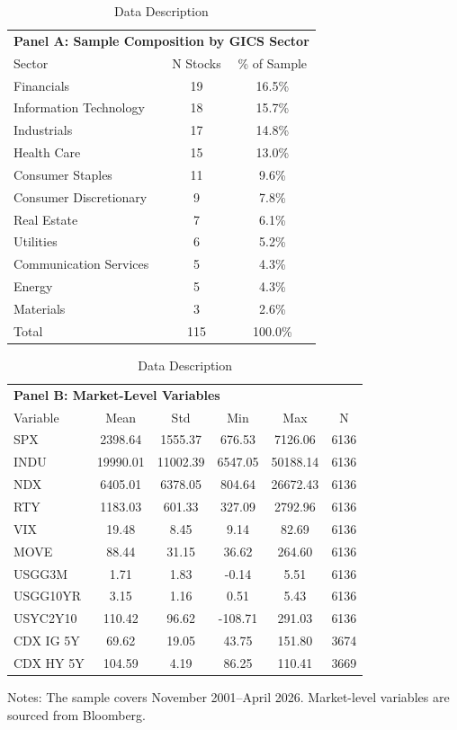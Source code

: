 
\begin{table}[h!]
\centering
\caption{Data Description}
\label{tab:data_description}
\small
\begin{tabular}{lcc}
\toprule
\multicolumn{3}{l}{\textbf{Panel A: Sample Composition by GICS Sector}} \\
Sector & N Stocks & \% of Sample \\
\midrule
Financials & 19 & 16.5\% \\
Information Technology & 18 & 15.7\% \\
Industrials & 17 & 14.8\% \\
Health Care & 15 & 13.0\% \\
Consumer Staples & 11 & 9.6\% \\
Consumer Discretionary & 9 & 7.8\% \\
Real Estate & 7 & 6.1\% \\
Utilities & 6 & 5.2\% \\
Communication Services & 5 & 4.3\% \\
Energy & 5 & 4.3\% \\
Materials & 3 & 2.6\% \\
\midrule
Total & 115 & 100.0\% \\
\bottomrule
\end{tabular}

\vspace{0.5cm}

\begin{tabular}{lccccc}
\toprule
\multicolumn{6}{l}{\textbf{Panel B: Market-Level Variables}} \\
Variable & Mean & Std & Min & Max & N \\
\midrule
SPX & 2398.64 & 1555.37 & 676.53 & 7126.06 & 6136 \\
INDU & 19990.01 & 11002.39 & 6547.05 & 50188.14 & 6136 \\
NDX & 6405.01 & 6378.05 & 804.64 & 26672.43 & 6136 \\
RTY & 1183.03 & 601.33 & 327.09 & 2792.96 & 6136 \\
VIX & 19.48 & 8.45 & 9.14 & 82.69 & 6136 \\
MOVE & 88.44 & 31.15 & 36.62 & 264.60 & 6136 \\
USGG3M & 1.71 & 1.83 & -0.14 & 5.51 & 6136 \\
USGG10YR & 3.15 & 1.16 & 0.51 & 5.43 & 6136 \\
USYC2Y10 & 110.42 & 96.62 & -108.71 & 291.03 & 6136 \\
CDX IG 5Y & 69.62 & 19.05 & 43.75 & 151.80 & 3674 \\
CDX HY 5Y & 104.59 & 4.19 & 86.25 & 110.41 & 3669 \\
\bottomrule
\end{tabular}
\begin{tablenotes}\small
\item Notes: The sample covers November 2001--April 2026. Market-level
variables are sourced from Bloomberg.
\end{tablenotes}
\end{table}
